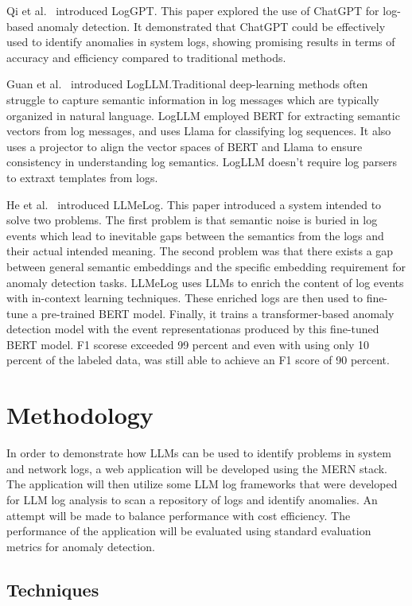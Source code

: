 \documentclass[sigconf]{acmart}
\begin{document}
Qi et al.~\cite{10466820} introduced LogGPT. This paper explored the use of ChatGPT for log-based anomaly detection. It demonstrated that ChatGPT could be effectively used to identify anomalies in system logs, showing promising results in terms of accuracy and efficiency compared to traditional methods.

Guan et al.~\cite{guan2025logllmlogbasedanomalydetection} introduced LogLLM.Traditional deep-learning methods often struggle to capture semantic information in log messages which are typically organized in natural language. LogLLM employed BERT for extracting semantic vectors from log messages, and uses Llama for classifying log sequences. It also uses a projector to align the vector spaces of BERT and Llama to ensure consistency in understanding log semantics. LogLLM doesn't require log parsers to extraxt templates from logs.

He et al.~\cite{10771398} introduced LLMeLog. This paper introduced a system intended to solve two problems. The first problem is that semantic noise is buried in log events which lead to inevitable gaps between the semantics from the logs and their actual intended meaning. The second problem was that there exists a gap between general semantic embeddings and the specific embedding requirement for anomaly detection tasks. LLMeLog uses LLMs to enrich the content of log events with in-context learning techniques. These enriched logs are then used to fine-tune a pre-trained BERT model. Finally, it trains a transformer-based anomaly detection model with the event representationas produced by this fine-tuned BERT model. F1 scorese exceeded 99 percent and even with using only 10 percent of the labeled data, was still able to achieve an F1 score of 90 percent.


\section{Methodology}

In order to demonstrate how LLMs can be used to identify problems in system and network logs, a web application will be developed using the MERN stack. The application will then utilize some LLM log frameworks that were developed for LLM log analysis to scan a repository of logs and identify anomalies. An attempt will be made to balance performance with cost efficiency. The performance of the application will be evaluated using standard evaluation metrics for anomaly detection.


\subsection{Techniques}
\end{document}
